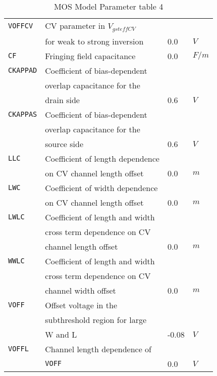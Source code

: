 \documentclass{article}
\begin{document}
\begin{table}[H]
\begin{tabular}{|l| l| l| l|}
\texttt{VOFFCV} & CV parameter in $V_{gsteffCV}$ & & \\
                & for weak to strong inversion & 0.0 & $V$\\
\texttt{CF} & Fringing field capacitance & 0.0 & $F/m$\\
\texttt{CKAPPAD} & Coefficient of bias-dependent & & \\
                 & overlap capacitance for the & & \\
                 & drain side & 0.6 & $V$\\
\texttt{CKAPPAS} & Coefficient of bias-dependent & & \\
                 & overlap capacitance for the & & \\
                 & source side & 0.6 & $V$\\
\texttt{LLC} &  Coefficient of length dependence & & \\
              & on CV channel length offset & 0.0 & $m$\\
\texttt{LWC} &  Coefficient of width dependence & & \\
              & on CV channel length offset & 0.0 & $m$\\
\texttt{LWLC} & Coefficient of length and width & & \\
              & cross term dependence on CV & & \\
              & channel length offset & 0.0 & $m$\\
\texttt{WWLC} & Coefficient of length and width & & \\
              & cross term dependence on CV & & \\
              & channel width offset & 0.0 & $m$\\
\texttt{VOFF} & Offset voltage in the & & \\
              & subthreshold region for large & & \\
              & W and L & -0.08 & $V$\\
\texttt{VOFFL} & Channel length dependence of & & \\
               & \texttt{VOFF} & 0.0 & $V$\\
\hline
\end{tabular}
\caption{\label{bsim4.params4} MOS Model Parameter table 4}
\end{table}
\end{document}
